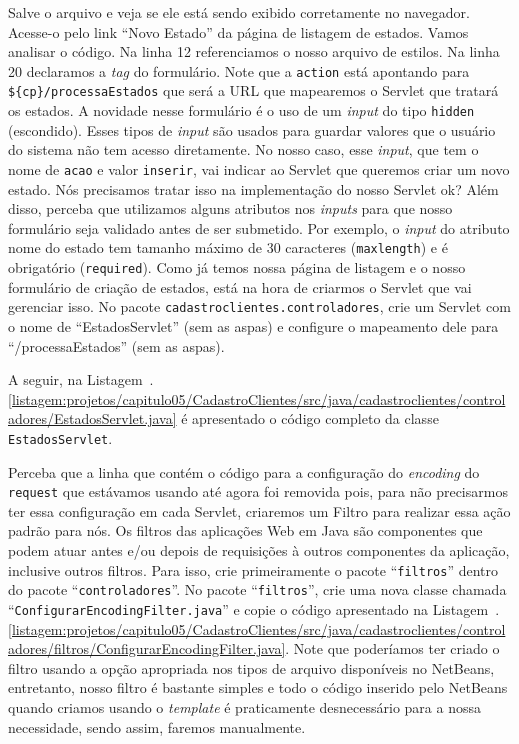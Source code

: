 Salve o arquivo e veja se ele está sendo exibido corretamente no navegador. Acesse-o pelo link ``Novo Estado'' da página de listagem de estados. Vamos analisar o código. Na linha 12 referenciamos o nosso arquivo de estilos. Na linha 20 declaramos a \textit{tag} do formulário. Note que a \texttt{action} está apontando para \texttt{\$\{cp\}/processaEstados} que será a URL que mapearemos o Servlet que tratará os estados. A novidade nesse formulário é o uso de um \textit{input} do tipo \texttt{hidden} (escondido). Esses tipos de \textit{input} são usados para guardar valores que o usuário do sistema não tem acesso diretamente. No nosso caso, esse \textit{input}, que tem o nome de \texttt{acao} e valor \texttt{inserir}, vai indicar ao Servlet que queremos criar um novo estado. Nós precisamos tratar isso na implementação do nosso Servlet ok? Além disso, perceba que utilizamos alguns atributos nos \textit{inputs} para que nosso formulário seja validado antes de ser submetido. Por exemplo, o \textit{input} do atributo nome do estado tem tamanho máximo de 30 caracteres (\texttt{maxlength}) e é obrigatório (\texttt{required}). Como já temos nossa página de listagem e o nosso formulário de criação de estados, está na hora de criarmos o Servlet que vai gerenciar isso. No pacote \texttt{cadastroclientes.controladores}, crie um Servlet com o nome de ``EstadosServlet'' (sem as aspas) e configure o mapeamento dele para ``/processaEstados'' (sem as aspas).

A seguir, na Listagem~\thechapter.\ref{listagem:projetos/capitulo05/CadastroClientes/src/java/cadastroclientes/controladores/EstadosServlet.java} é apresentado o código completo da classe \texttt{EstadosServlet}.


Perceba que a linha que contém o código para a configuração do \textit{encoding} do \texttt{request} que estávamos usando até agora foi removida pois, para não precisarmos ter essa configuração em cada Servlet, criaremos um Filtro para realizar essa ação padrão para nós. Os filtros das aplicações Web em Java são componentes que podem atuar antes e/ou depois de requisições à outros componentes da aplicação, inclusive outros filtros. Para isso, crie primeiramente o pacote ``\texttt{filtros}'' dentro do pacote\linebreak%
``\texttt{controladores}''. No pacote ``\texttt{filtros}'', crie uma nova classe chamada\linebreak%
``\texttt{ConfigurarEncodingFilter.java}'' e copie o código apresentado na Listagem~\thechapter.\ref{listagem:projetos/capitulo05/CadastroClientes/src/java/cadastroclientes/controladores/filtros/ConfigurarEncodingFilter.java}. Note que poderíamos ter criado o filtro usando a opção apropriada nos tipos de arquivo disponíveis no NetBeans, entretanto, nosso filtro é bastante simples e todo o código inserido pelo NetBeans quando criamos usando o \textit{template} é praticamente desnecessário para a nossa necessidade, sendo assim, faremos manualmente.

